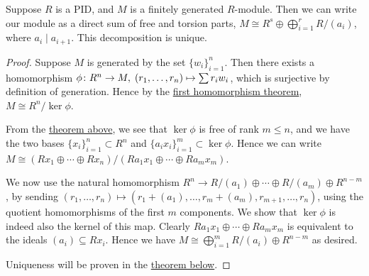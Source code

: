 \begin{theorem}\label{thm:structure-invariant}
    Suppose \(R\) is a PID,
    and \(M\) is a finitely generated \(R\)-module.
    Then we can write our module as a direct sum of free and torsion parts,
    \(M \cong R^s \oplus \bigoplus_{i=1}^r R/(a_i)\), where \(a_i \mid a_{i+1}\).
    This decomposition is unique.
\end{theorem}
\begin{proof}
    Suppose \(M\) is generated by the set \({\{w_i\}}_{i=1}^n\).
    Then there exists a homomorphism \(\phi\colon R^n\to M,\;(r_1,\hdots,r_n)\mapsto\sum r_i w_i\),
    which is surjective by definition of generation.
    Hence by the \hyperref[thm:iso-1-mod]{first homomorphism theorem},
    \(M \cong R^n/\ker\phi\).

    From the \hyperref[thm:pid-submodule-free]{theorem above},
    we see that \(\ker\phi\) is free of rank \(m \leq n\),
    and we have the two bases \({\{x_i\}}_{i=1}^n \subset R^n\)
    and \({\{a_i x_i\}}_{i=1}^m \subset \ker\phi\).
    Hence we can write \(M \cong (Rx_1 \oplus \cdots \oplus Rx_n)/(Ra_1x_1 \oplus \cdots \oplus Ra_mx_m)\).

    We now use the natural homomorphism \(R^n \to R/(a_1) \oplus \cdots \oplus R/(a_m) \oplus R^{n-m}\),
    by sending \((r_1,\hdots,r_n) \mapsto (r_1+(a_1),\hdots,r_m+(a_m),r_{m+1},\hdots,r_n)\),
    using the quotient homomorphisms of the first \(m\) components.
    We show that \(\ker\phi\) is indeed also the kernel of this map.
    Clearly \(Ra_1x_1 \oplus \cdots \oplus Ra_mx_m\)
    is equivalent to the ideals \((a_i) \subseteq Rx_i\).
    Hence we have \(M \cong \bigoplus_{i=1}^m R/(a_i) \oplus R^{n-m}\) as desired.

    Uniqueness will be proven in the \hyperref[thm:structure-divisor]{theorem below}.
\end{proof}

